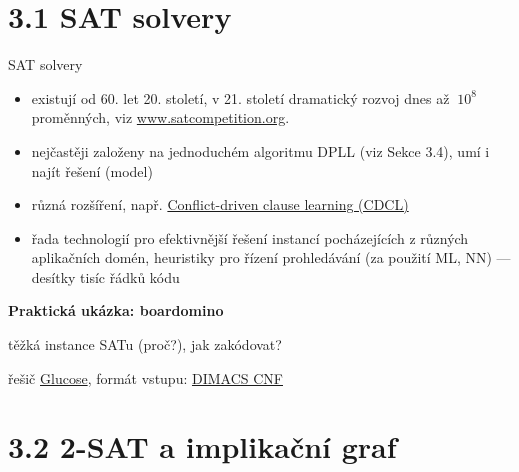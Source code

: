 \documentclass{beamer}
\begin{document}
\section{3.1 SAT solvery}


\begin{frame}{SAT solvery}

    \begin{itemize}
        \item existují od 60. let 20. století, v 21. století dramatický rozvoj dnes až $~10^8$ proměnných, viz \href{http://www.satcompetition.org}{\alert{www.satcompetition.org}}.
        \item nejčastěji založeny na jednoduchém \alert{algoritmu DPLL} (viz Sekce 3.4), umí i najít řešení (model)
        \item různá rozšíření, např. \href{https://en.wikipedia.org/wiki/Conflict-driven_clause_learning}{\alert{Conflict-driven clause learning (CDCL)}}
        \item řada technologií pro efektivnější řešení instancí pocházejících z různých aplikačních domén, heuristiky pro řízení prohledávání (za použití ML, NN) --- desítky tisíc řádků kódu
    \end{itemize}
    
    \textbf{Praktická ukázka: boardomino}

    \smallskip


    \smallskip

    těžká instance SATu (proč?), jak zakódovat? 
    
    řešič \href{http://www.labri.fr/perso/lsimon/glucose/}{\alert{Glucose}}, formát vstupu: \href{http://people.sc.fsu.edu/~jburkardt/data/cnf/cnf.html}{\alert{DIMACS CNF}}
    
\end{frame}


\section{3.2 2-SAT a implikační graf}
\end{document}
